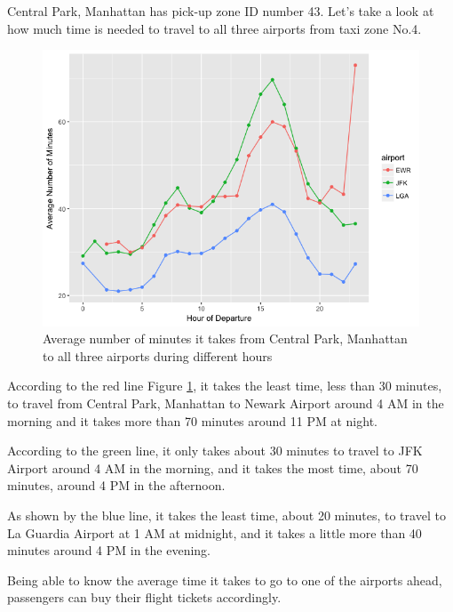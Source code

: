 \documentclass[12pt,twoside]{reedthesis}
\theoremstyle{definition}
\theoremstyle{definition}
\theoremstyle{definition}
\theoremstyle{remark}
\begin{document}
Central Park, Manhattan has pick-up zone ID number 43. Let's take a look
at how much time is needed to travel to all three airports from taxi
zone No.4.
\begin{figure}
\includegraphics[width=5.67in]{figure/airport_vis} \caption{Average number of minutes it takes from Central Park, Manhattan to all three airports during different hours}\label{fig:airport-vis}
\end{figure}
According to the red line Figure \ref{fig:airport-vis}, it takes the
least time, less than 30 minutes, to travel from Central Park, Manhattan
to Newark Airport around 4 AM in the morning and it takes more than 70
minutes around 11 PM at night.

According to the green line, it only takes about 30 minutes to travel to
JFK Airport around 4 AM in the morning, and it takes the most time,
about 70 minutes, around 4 PM in the afternoon.

As shown by the blue line, it takes the least time, about 20 minutes, to
travel to La Guardia Airport at 1 AM at midnight, and it takes a little
more than 40 minutes around 4 PM in the evening.

Being able to know the average time it takes to go to one of the
airports ahead, passengers can buy their flight tickets accordingly.
\end{document}
